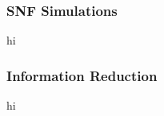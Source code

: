 
\begin{frame}
  \frametitle{SNF Simulations}
  hi
\end{frame}

\begin{frame}
  \frametitle{Information Reduction}
  hi
\end{frame}

